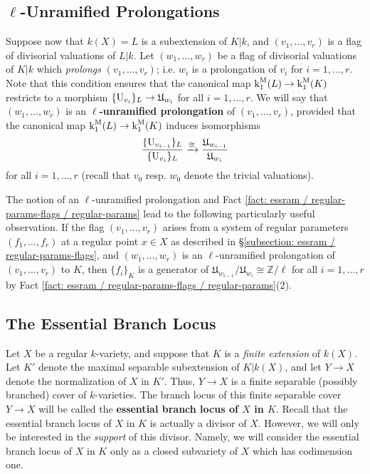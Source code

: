 \documentclass[11pt]{amsart}
\theoremstyle{definition}
\theoremstyle{remark}
\numberwithin{equation}{section}
\newcommand{\Z}{\mathbb{Z}}
\newcommand{\U}{{\rm U}}
\newcommand{\Ufrak}{\mathfrak{U}}
\renewcommand{\k}{\operatorname{k}^{\rm M}}
\begin{document}
\subsection{$\ell$-Unramified Prolongations}
\label{subsection: essram / ell-unram}
Suppose now that $k(X) = L$ is a subextension of $K|k$, and $(v_1,\ldots,v_r)$ is a flag of divisorial valuations of $L|k$.
Let $(w_1,\ldots,w_r)$ be a flag of divisorial valuations of $K|k$ which \emph{prolongs} $(v_1,\ldots,v_r)$; i.e. $w_i$ is a prolongation of $v_i$ for $i = 1,\ldots,r$.
Note that this condition ensures that the canonical map $\k_1(L) \rightarrow \k_1(K)$ restricts to a morphism $\{\U_{v_i}\}_L \rightarrow \Ufrak_{w_i}$ for all $i = 1,\ldots,r$.
We will say that $(w_1,\ldots,w_r)$ is an {\bf $\ell$-unramified prolongation} of $(v_1,\ldots,v_r)$, provided that the canonical map $\k_1(L) \rightarrow \k_1(K)$ induces isomorphisms
\[ \frac{\{\U_{v_{i-1}}\}_L}{\{\U_{v_i}\}_L} \xrightarrow{\cong} \frac{\Ufrak_{w_{i-1}}}{\Ufrak_{w_i}} \]
for all $i = 1,\ldots,r$ (recall that $v_0$ resp. $w_0$ denote the trivial valuations).

The notion of an $\ell$-unramified prolongation and Fact \ref{fact: essram / regular-params-flags / regular-params} lead to the following particularly useful observation.
If the flag $(v_1,\ldots,v_r)$ arises from a system of regular parameters $(f_1,\ldots,f_r)$ at a regular point $x \in X$ as described in \S\ref{subsection: essram / regular-params-flags}, and $(w_1,\ldots,w_r)$ is an $\ell$-unramified prolongation of $(v_1,\ldots,v_r)$ to $K$, then $\{f_i\}_K$ is a generator of $\Ufrak_{w_{i-1}}/\Ufrak_{w_i} \cong \Z/\ell$ for all $i = 1,\ldots,r$ by Fact \ref{fact: essram / regular-params-flags / regular-params}(2).

\subsection{The Essential Branch Locus}
\label{subsection: essram / essential-branch-locus}

Let $X$ be a regular $k$-variety, and suppose that $K$ is a \emph{finite extension} of $k(X)$.
Let $K'$ denote the maximal separable subextension of $K|k(X)$, and let $Y \rightarrow X$ denote the normalization of $X$ in $K'$.
Thus, $Y \rightarrow X$ is a finite separable (possibly branched) cover of $k$-varieties.
The branch locus of this finite separable cover $Y \rightarrow X$ will be called the {\bf essential branch locus of $X$ in $K$}.
Recall that the essential branch locus of $X$ in $K$ is actually a divisor of $X$.
However, we will only be interested in the \emph{support} of this divisor.
Namely, we will consider the essential branch locus of $X$ in $K$ only as a closed subvariety of $X$ which has codimension one.
\end{document}
